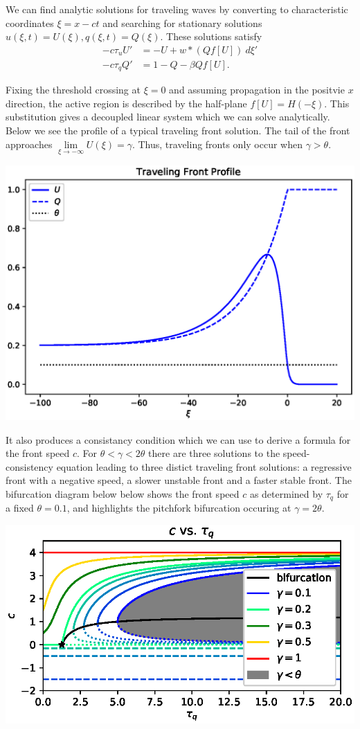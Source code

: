 \documentclass[landscape,final]{baposter}
\begin{document}
\begin{poster}
{	We can find analytic solutions for traveling waves by converting to characteristic coordinates
	$\xi = x - ct$
	and searching for stationary solutions $u(\xi, t) = U(\xi), q(\xi, t) = Q(\xi)$. These solutions satisfy
	\begin{align*}
		-c\tau_u U' &= -U + w * (Q f[U]) \ d\xi' \\
		-c \tau_q Q' &= 1 - Q - \beta Q f[U].
	\end{align*}
}
{
	Fixing the threshold crossing at $\xi = 0$ and assuming propagation in the positvie $x$ direction, the active region is described by the half-plane $f[U] = H(-\xi)$. This substitution gives a decoupled linear system which we can solve analytically. Below we see the profile of a typical traveling front solution. The tail of the front approaches $\lim\limits_{\xi \to -\infty} U(\xi) = \gamma$. Thus, traveling fronts only occur when $\gamma > \theta$.
	\begin{center}
		\includegraphics[width=.45\linewidth]{front_profile}
	\end{center}
	It also produces a consistancy condition which we can use to derive a formula for the front speed $c$. For $\theta < \gamma < 2\theta$ there are three solutions to the speed-consistency equation leading to three distict traveling front solutions: a regressive front with a negative speed, a slower unstable front and a faster stable front. The bifurcation diagram below below shows the front speed $c$ as determined by $\tau_q$ for a fixed $\theta = 0.1$, and highlights the pitchfork bifurcation occuring at $\gamma = 2\theta$.
	\begin{center}
		\includegraphics[width=.45\linewidth]{speed_by_tau_q}
	\end{center}
}


\end{poster}
\end{document}
